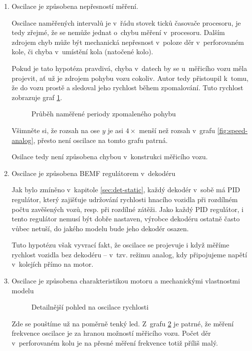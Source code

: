 \begin{enumerate}
\item Oscilace je způsobena nepřesností měření.

Oscilace naměřených intervalů je v~řádu stovek ticků časovače procesoru, je tedy
zřejmé, že se nemůže jednat o~chybu měření v~procesoru. Dalším zdrojem chyb
může být mechanická nepřesnost v~poloze děr v~perforovaném kole, či chyba
v~umístění kola (natočené kolo).

Pokud je tato hypotéza pravdivá, chyba v~datech by se u~měřicího vozu měla
projevit, ať už je zdrojem pohybu vozu cokoliv. Autor tedy přistoupil k~tomu,
že do vozu prostě  a sledoval jeho rychlost během zpomalování.
Tuto rychlost zobrazuje graf \ref{fig:speed-zduch}.

\begin{figure}[h]

\caption{Průběh naměřené periody zpomaleného pohybu}
\label{fig:speed-zduch}
\end{figure}

Všimněte si, že rozsah na ose $y$ je asi $4 \times$ menší než rozsah v~grafu
\ref{fig:speed-analog}, přesto není oscilace na tomto grafu patrná.

Osilace tedy není způsobena chybou v~konstrukci měřicího vozu.

\item Oscilace je způsobena BEMF regulátorem v~dekodéru

Jak bylo zmíněno v~kapitole \ref{sec:det-static}, každý dekodér v~sobě má PID
regulátor, který zajišťuje udržování rychlosti hnacího vozidla při rozdílném
počtu zavěšených vozů, resp. při rozdílné zátěži. Jako každý PID regulátor,
i tento regulátor nemusí být dobře nastaven, výrobce dekodéru ostatně často
vůbec netuší, do jakého modelu bude jeho dekodér osazen.

Tuto hypotézu však vyvrací fakt, že oscilace se projevuje i když měříme rychlost
vozidla bez dekodéru -- v~tzv. režimu analog, kdy připojujeme napětí v~kolejích
přímo na motor.

\item Oscilace je způsobena charakteristikou motoru a mechanickými vlastnostmi
modelu

\begin{figure}[h]

\caption{Detailnější pohled na oscilace rychlosti}
\label{fig:speed-presny}
\end{figure}

Zde se pouštíme už na poměrně tenký led. Z~grafu \ref{fig:speed-presny} je
patrné, že měření frekvence oscilace je za hranou možností měřicího
vozu. Počet děr v~perforovaném kolu je na přesné měření frekvence totiž příliš
malý.


\end{enumerate}
